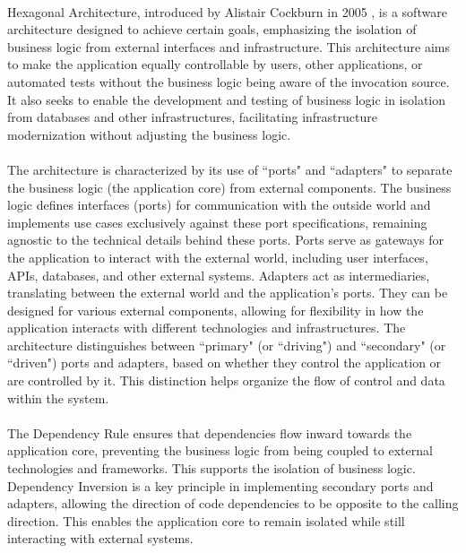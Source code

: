 \paragraph{} Hexagonal Architecture, introduced by Alistair Cockburn in 2005 \cite{cockburn2005hexagonal}, is a software architecture designed to achieve certain goals, emphasizing the isolation of business logic from external interfaces and infrastructure. This architecture aims to make the application equally controllable by users, other applications, or automated tests without the business logic being aware of the invocation source. It also seeks to enable the development and testing of business logic in isolation from databases and other infrastructures, facilitating infrastructure modernization without adjusting the business logic.

\paragraph{} The architecture is characterized by its use of ``ports" and ``adapters" to separate the business logic (the application core) from external components. The business logic defines interfaces (ports) for communication with the outside world and implements use cases exclusively against these port specifications, remaining agnostic to the technical details behind these ports. Ports serve as gateways for the application to interact with the external world, including user interfaces, APIs, databases, and other external systems. Adapters act as intermediaries, translating between the external world and the application's ports. They can be designed for various external components, allowing for flexibility in how the application interacts with different technologies and infrastructures.
The architecture distinguishes between ``primary" (or ``driving") and ``secondary" (or ``driven") ports and adapters, based on whether they control the application or are controlled by it. This distinction helps organize the flow of control and data within the system.

\paragraph{} The Dependency Rule ensures that dependencies flow inward towards the application core, preventing the business logic from being coupled to external technologies and frameworks. This supports the isolation of business logic. Dependency Inversion is a key principle in implementing secondary ports and adapters, allowing the direction of code dependencies to be opposite to the calling direction. This enables the application core to remain isolated while still interacting with external systems.

